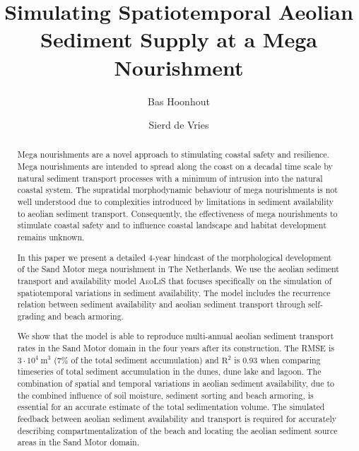 \documentclass[preprint,12pt,authoryear]{elsarticle}
\begin{document}
\begin{frontmatter}

  \title{Simulating Spatiotemporal Aeolian Sediment Supply at a Mega Nourishment}

  \author[deltares]{Bas Hoonhout}

  \author[tudelft]{Sierd de Vries}

  \address[deltares]{Deltares, Department of Hydraulic Engineering,
    Boussinesqweg 1, 2629HV Delft, The Netherlands.}

  \address[tudelft]{Delft University of Technology, Faculty of Civil
    Engineering and Geosciences, Department of Hydraulic Engineering,
    Stevinweg 1, 2628CN Delft, The Netherlands.}

  \begin{abstract}
    Mega nourishments are a novel approach to stimulating coastal
    safety and resilience. Mega nourishments are intended to spread
    along the coast on a decadal time scale by natural sediment
    transport processes with a minimum of intrusion into the natural
    coastal system. The supratidal morphodynamic behaviour of mega
    nourishments is not well understood due to complexities introduced
    by limitations in sediment availability to aeolian sediment
    transport. Consequently, the effectiveness of mega nourishments to
    stimulate coastal safety and to influence coastal landscape and
    habitat development remains unknown.

    In this paper we present a detailed 4-year hindcast of the
    morphological development of the Sand Motor mega nourishment in
    The Netherlands. We use the aeolian sediment transport and
    availability model \textsc{AeoLiS} that focuses specifically on
    the simulation of spatiotemporal variations in sediment
    availability. The model includes the recurrence relation between
    sediment availability and aeolian sediment transport through
    self-grading and beach armoring.

    We show that the model is able to reproduce multi-annual aeolian
    sediment transport rates in the Sand Motor domain in the four
    years after its construction. The RMSE is $3 \cdot 10^4 ~
    \mathrm{m^3}$ (7\% of the total sediment accumulation) and
    $\mathrm{R^2}$ is 0.93 when comparing timeseries of total sediment
    accumulation in the dunes, dune lake and lagoon. The combination
    of spatial and temporal variations in aeolian sediment
    availability, due to the combined influence of soil moisture,
    sediment sorting and beach armoring, is essential for an accurate
    estimate of the total sedimentation volume. The simulated feedback
    between aeolian sediment availability and transport is required
    for accurately describing compartmentalization of the beach and
    locating the aeolian sediment source areas in the Sand Motor
    domain.
    

\end{abstract}
\end{frontmatter}
\end{document}
